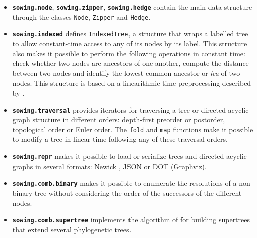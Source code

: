 \begin{itemize}
    \item \textbf{\texttt{sowing.node}}, \textbf{\texttt{sowing.zipper}}, \textbf{\texttt{sowing.hedge}} contain the main data structure through the classes \texttt{Node}, \texttt{Zipper} and \texttt{Hedge}.
    \item \textbf{\texttt{sowing.indexed}} defines \texttt{IndexedTree}, a structure that wraps a labelled tree to allow constant-time access to any of its nodes by its label.
        This structure also makes it possible to perform the following operations in constant time: check whether two nodes are ancestors of one another, compute the distance between two nodes and identify the lowest common ancestor or \emph{lca} of two nodes.
        This structure is based on a linearithmic-time preprocessing described by \textcite{Bender2000LcaProblemRevisited}.
    \item \textbf{\texttt{sowing.traversal}} provides iterators for traversing a tree or directed acyclic graph structure in different orders: depth-first preorder or postorder, topological order or Euler order.
        The \texttt{fold} and \texttt{map} functions make it possible to modify a tree in linear time following any of these traversal orders.
    \item \textbf{\texttt{sowing.repr}} makes it possible to load or serialize trees and
        directed acyclic graphs in several formats: Newick \parencite{Felsenstein1986NewickTreeFormat}, JSON or DOT (Graphviz).
    \item \textbf{\texttt{sowing.comb.binary}} makes it possible to enumerate the resolutions of a non-binary tree without considering the order of the successors of the different nodes.
    \item \textbf{\texttt{sowing.comb.supertree}} implements the algorithm of \textcite{Ng1996ReconstructionRootedTrees} for building supertrees that extend several phylogenetic trees.
\end{itemize}

